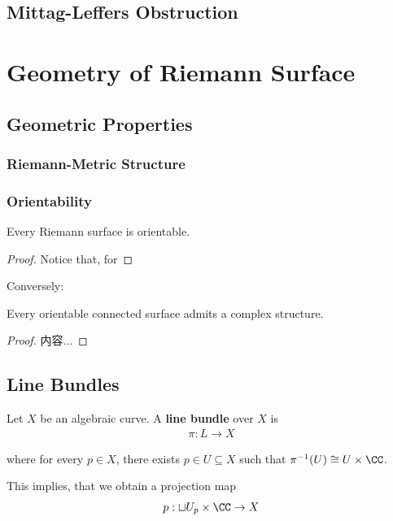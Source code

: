 \documentclass[Total.tex]{subfiles}
\begin{document}
	\section{Mittag-Leffers Obstruction}
	\chapter{Geometry of Riemann Surface}
		\section{Geometric Properties}
		\subsection{Riemann-Metric Structure}
		\subsection{Orientability}
			\begin{proposition}
				Every Riemann surface is orientable. 
			\end{proposition}
			\begin{proof}
				Notice that, for 
			\end{proof}
			
			Conversely:
			
			\begin{theorem}
				Every orientable connected surface admits a complex structure.
			\end{theorem}
			\begin{proof}
				内容...
			\end{proof}
		\section{Line Bundles}
			\begin{Def}
				Let $X$ be an algebraic curve. A \textbf{line bundle} over $X$ is 
				\begin{gather*}
					\pi:L\rightarrow X
				\end{gather*}
				
				where for every $p\in X$, there exists $p\in U\subseteq X$ such that $\pi^{-1}(U)\cong U\times \CC$. 
			\end{Def}
			
			This implies, that we obtain a projection map
			\begin{gather*}
				p:\sqcup U_p\times \CC\rightarrow X
			\end{gather*}
			
\end{document}
